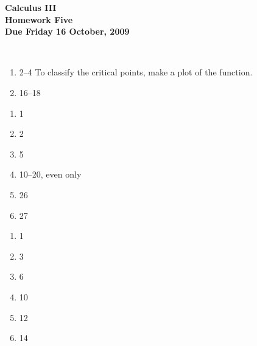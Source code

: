 \documentclass[12pt]{article}
\begin{document}
\pagestyle{empty}
 
\begin{center}
{\large {\bf Calculus III}}\\
\medskip
{\large {\bf Homework Five}}\\
\medskip
{ {\bf Due Friday 16 October, 2009}}\\
\end{center}

\hspace{2mm}\\


\begin{enumerate}
\setlength{\itemsep}{-1mm}
  \item 2--4  To classify the critical points, make a plot of the
    function. 
  \item 16--18
\end{enumerate}

\begin{enumerate}
\setlength{\itemsep}{-1mm}
  \item 1
  \item 2
  \item 5
  \item 10--20, even only
  \item 26
  \item 27
\end{enumerate}

\begin{enumerate}
\setlength{\itemsep}{-1mm}
  \item 1
  \item 3
  \item 6
  \item 10
  \item 12
  \item 14
\end{enumerate}
\end{document}
